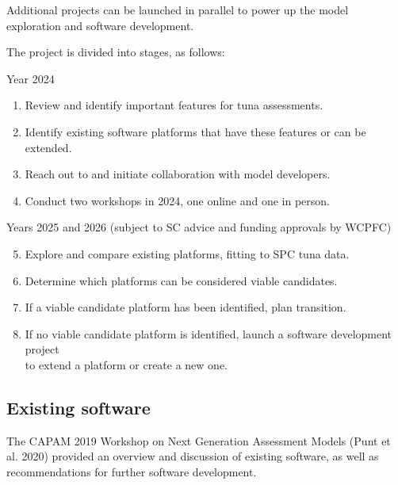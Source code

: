 \documentclass{SCreport}
\begin{document}
Additional projects can be launched in parallel to power up the model
exploration and software development.

The project is divided into stages, as follows:

Year 2024

\begin{enumerate}
  \item Review and identify important features for tuna assessments.\\[-4.5ex]
  \item Identify existing software platforms that have these features or can be
  extended.\\[-4.5ex]
  \item Reach out to and initiate collaboration with model developers.\\[-4.5ex]
  \item Conduct two workshops in 2024, one online and one in person.\\
\end{enumerate}

Years 2025 and 2026 (subject to SC advice and funding approvals by WCPFC)

\begin{enumerate}\setcounter{enumi}{4}
  \item Explore and compare existing platforms, fitting to SPC tuna
  data.\\[-4.5ex]
  \item Determine which platforms can be considered viable candidates.\\[-4.5ex]
  \item If a viable candidate platform has been identified, plan
  transition.\\[-4.5ex]
  \item If no viable candidate platform is identified, launch a software
  development project\\
  to extend a platform or create a new one.
\end{enumerate}

\newpage

\subsection{Existing software}

The CAPAM 2019 Workshop on Next Generation Assessment Models (Punt et al. 2020)
provided an overview and discussion of existing software, as well as
recommendations for further software development.
\end{document}
